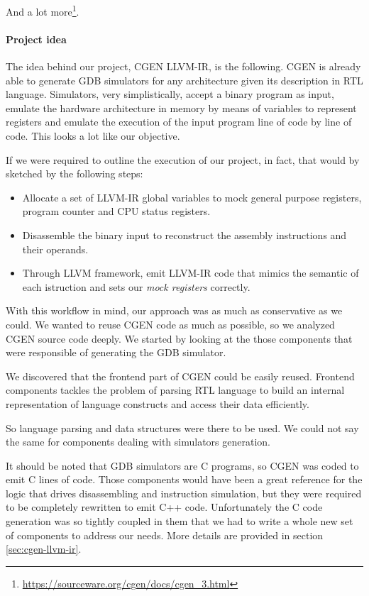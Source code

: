 \documentclass{article}
\begin{document}
And a lot more\footnote{\url{https://sourceware.org/cgen/docs/cgen_3.html}}.

\paragraph{Project idea}
The idea behind our project, CGEN LLVM-IR, is the following. CGEN is already able to generate GDB simulators for any architecture given its description in RTL language. Simulators, very simplistically, accept a binary program as input, emulate the hardware architecture in memory by means of variables to represent registers and emulate the execution of the input program line of code by line of code. This looks a lot like our objective.

If we were required to outline the execution of our project, in fact, that would by sketched by the following steps:
\begin{itemize}
\item Allocate a set of LLVM-IR global variables to mock general purpose registers, program counter and CPU status registers.
\item Disassemble the binary input to reconstruct the assembly instructions and their operands.
\item Through LLVM framework, emit LLVM-IR code that mimics the semantic of each istruction and sets our \emph{mock registers} correctly.
\end{itemize}

With this workflow in mind, our approach was as much as conservative as we could. We wanted to reuse CGEN code as much as possible, so we analyzed CGEN source code deeply. We started by looking at the those components that were responsible of generating the GDB simulator.

We discovered that the frontend part of CGEN could be easily reused. Frontend components tackles the problem of parsing RTL language to build an internal representation of language constructs and access their data efficiently.

So language parsing and data structures were there to be used. We could not say the same for components dealing with simulators generation.

It should be noted that GDB simulators are C programs, so CGEN was coded to emit C lines of code. Those components would have been a great reference for the logic that drives disassembling and instruction simulation, but they were required to be completely rewritten to emit C++ code. Unfortunately the C code generation was so tightly coupled in them that we had to write a whole new set of components to address our needs. More details are provided in section \ref{sec:cgen-llvm-ir}.
\clearpage
\end{document}
